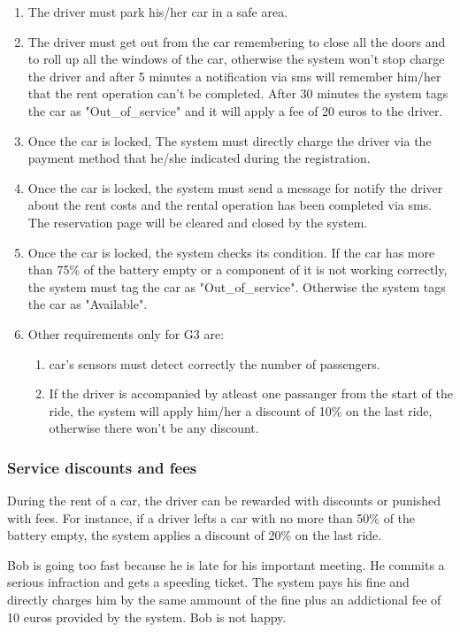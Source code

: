 \begin{enumerate}
	\item The driver must park his/her car in a safe area.
	\item The driver must get out from the car remembering to close all the doors and to roll up all the windows of the car, otherwise the system won't stop charge the driver and after 5 minutes a notification via sms will remember him/her that the rent operation can't be completed.
	After 30 minutes the system tags the car as "Out\_of\_service" and it will apply a fee of 20 euros to the driver.
	\item Once the car is locked, The system must directly charge the driver via the payment method that he/she indicated during the registration.
	\item Once the car is locked, the system must send a message for notify the driver about the rent costs and the rental operation has been completed via sms. The reservation page will be cleared and closed by the system.
	\item Once the car is locked, the system checks its condition. If the car has more than 75\% of the battery empty or a component of it is not working correctly, the system must tag the car as "Out\_of\_service". Otherwise the system tags the car as "Available".
	\item Other requirements only for G3 are:
	\begin{enumerate}
		\item car's sensors must detect correctly the number of passengers.
		\item If the driver is accompanied by atleast one passanger from the start of the ride, the system will apply him/her a discount of 10\% on the last ride, otherwise there won't be any discount.
	\end{enumerate}
\end{enumerate}

\subsubsection{Service discounts and fees}

During the rent of a car, the driver can be rewarded with discounts or punished with fees.
For instance, if a driver lefts a car with no more than 50\% of the battery empty, the system applies a discount of 20\% on the last ride.


Bob is going too fast because he is late for his important meeting. He commits a serious infraction and gets a speeding ticket. The system pays his fine and directly charges him by the same ammount of the fine plus an addictional fee of 10 euros provided by the system. Bob is not happy.

